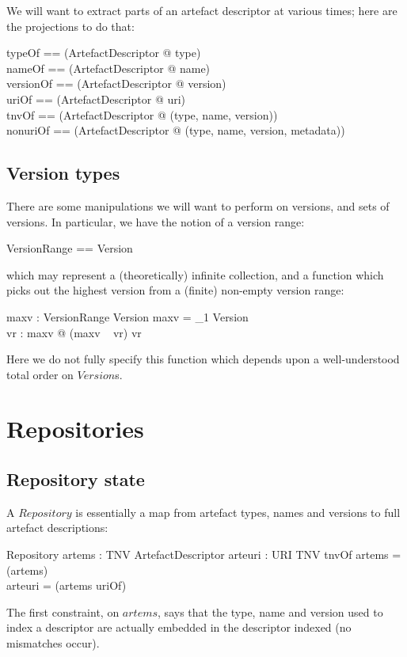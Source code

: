 \documentclass[a4paper,titlepage,twoside,12pt]{article}
\begin{document}
We will want to extract parts of an artefact descriptor at various times; here are the projections to do that:
\begin{zed}
	typeOf == (\lambda ArtefactDescriptor @ type)		\\
	nameOf == (\lambda ArtefactDescriptor @ name)	\\
	versionOf == (\lambda ArtefactDescriptor @ version)	\\
	uriOf == (\lambda ArtefactDescriptor @ uri)		\\
	tnvOf == (\lambda ArtefactDescriptor @ (type, name, version))	\\
	nonuriOf == (\lambda ArtefactDescriptor @ (type, name, version, metadata))
\end{zed}

\subsection{Version types}
There are some manipulations we will want to perform on versions, and sets of versions. In particular, we have the notion of a version range:
\begin{zed}
	VersionRange == \power Version
\end{zed}
which may represent a (theoretically) infinite collection, and a function which picks out the highest version from a (finite) non-empty version range:
\begin{axdef}
	maxv : VersionRange \pfun Version
\where
	\dom maxv = \finset_1 Version	\\
	\forall vr : \dom maxv @ (maxv ~ vr) \in vr
\end{axdef}
Here we do not fully specify this function which depends upon a well-understood total order 
on $Version$s.

\section{Repositories}
\subsection{Repository state}
A $Repository$ is essentially a map from artefact types, names and versions to full artefact descriptions:
\begin{schema}{Repository}
	artems : TNV \finj ArtefactDescriptor
\also
	arteuri : URI \finj TNV
\where
	tnvOf \circ artems = \id (\dom artems)	\\
\also
	arteuri = (artems \comp uriOf) \inv
\end{schema}
The first constraint, on $artems$, says that the type, name and version used to index a descriptor are actually embedded in the descriptor indexed (no mismatches occur).
\end{document}
